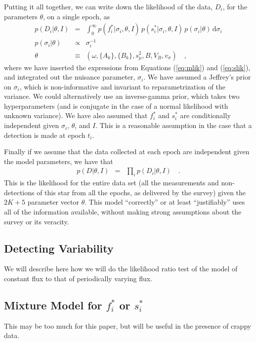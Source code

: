 \documentclass[12pt,preprint]{aastex}
\newcommand{\dd}{\mathrm{d}}
\newcommand{\fobs}{f_i^*}
\newcommand{\sobs}{s_i^*}
\begin{document}
Putting it all together, we can write down the likelihood of the data, $D_i$, for the parameters $\theta$, on a single epoch, as
\begin{eqnarray}\displaystyle
p(D_i|\theta,I) &=& \int_0^{\infty} p(\fobs |\sigma_i,\theta,I)\, p(\sobs |\sigma_i,\theta,I)\, p(\sigma_i | \theta)\,\dd \sigma_i
\\
p(\sigma_i|\theta) &\propto& \sigma_i^{-1}
\\
\theta &\equiv& (\omega, \{A_k\}, \{B_k\}, s_\mu^2, B, V_B ,v_\sigma) \quad ,
\end{eqnarray}
where we have inserted the expressions from Equations (\ref{eq:mlik}) and (\ref{eq:slik}), and integrated out the nuisance parameter, $\sigma_i$.  We have assumed a Jeffrey's prior on $\sigma_i$, which is non-informative and invariant to reparametrization of the variance.  We could alternatively use an inverse-gamma prior, which takes two hyperparameters (and is conjugate in the case of a normal likelihood with unknown variance).  We have also assumed that $\fobs$ and $\sobs$ are conditionally independent given $\sigma_i$, $\theta$, and $I$.  This is a reasonable assumption in the case that a detection is made at epoch $t_i$.


Finally if we assume that the data collected at each epoch are independent given the model parameters, we have that
\begin{eqnarray}\displaystyle
p(D|\theta,I) &=& \prod_i p(D_i|\theta,I)
\quad.
\end{eqnarray}
This is the likelihood for the entire
data set (all the measurements and non-detections of this star from
all the epochs, as delivered by the survey) given the $2K + 5$ parameter vector $\theta$.  This model
``correctly'' or at least ``justifiably'' uses all of the information
available, without making strong assumptions about the survey or its
veracity.


\subsection{Detecting Variability}

We will describe here how we will do the likelihood ratio test of the model of constant flux to that of periodically varying flux.


\subsection{Mixture Model for $\fobs$ or $\sobs$}

This may be too much for this paper, but will be useful in the presence of crappy data.




\end{document}
